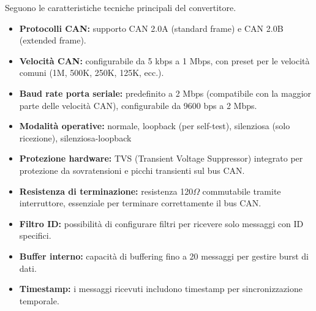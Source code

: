 Seguono le caratteristiche tecniche principali del convertitore.
\begin{itemize}
    \item \textbf{Protocolli CAN:} supporto CAN 2.0A (standard frame) e CAN 2.0B (extended frame).
    \item \textbf{Velocità CAN:} configurabile da 5 kbps a 1 Mbps, con preset per le velocità comuni (1M, 500K, 250K, 125K, ecc.).
    \item \textbf{Baud rate porta seriale:} predefinito a 2 Mbps (compatibile con la maggior parte delle velocità CAN), configurabile da 9600 bps a 2 Mbps.
    \item \textbf{Modalità operative:} normale, loopback (per self-test), silenziosa (solo ricezione), silenziosa-loopback
    \item \textbf{Protezione hardware:} TVS (Transient Voltage Suppressor) integrato per protezione da sovratensioni e picchi transienti sul bus CAN.
    \item \textbf{Resistenza di terminazione:} resistenza 120$\Omega$ commutabile tramite interruttore, essenziale per terminare correttamente il bus CAN.
    \item \textbf{Filtro ID:} possibilità di configurare filtri per ricevere solo messaggi con ID specifici.
    \item \textbf{Buffer interno:} capacità di buffering fino a 20 messaggi per gestire burst di dati.
    \item \textbf{Timestamp:} i messaggi ricevuti includono timestamp per sincronizzazione temporale.
\end{itemize}


